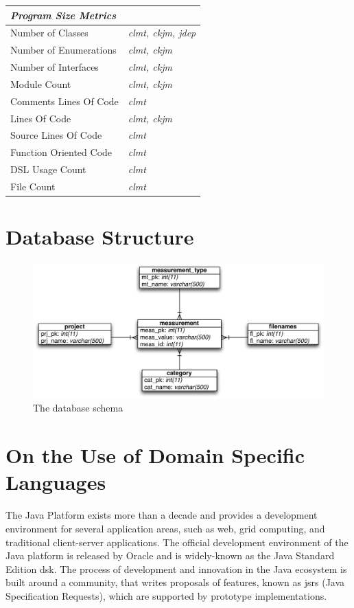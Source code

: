 \documentclass{sig-alternate}
\begin{document}
\begin{table}
\begin{tabular}{l l}
\hline
\multicolumn{2}{l}{\textit{\textbf{Program Size Metrics}}}\\
\hline
Number of Classes & \textit{clmt, ckjm, jdep}\\
Number of Enumerations & \textit{clmt, ckjm}\\
Number of Interfaces & \textit{clmt, ckjm}\\
Module Count & \textit{clmt, ckjm}\\
Comments Lines Of Code & \textit{clmt}\\
Lines Of Code & \textit{clmt, ckjm}\\
Source Lines Of Code & \textit{clmt}\\
Function Oriented Code & \textit{clmt}\\
DSL Usage Count & \textit{clmt}\\
File Count & \textit{clmt}\\
\hline
\end{tabular}
\end{table}

\section{Database Structure}
\label{sec:db}

\begin{figure}
\centering
\includegraphics[scale=0.7]{database-schema}
\caption{The database schema}
\label{fig:database-schema}
\end{figure}

\section{On the Use of Domain Specific Languages}
\label{sec:dsl}

The Java Platform exists more than a decade and provides a development environment for several application areas, such as web, grid computing, and traditional client-server applications. The official development environment of the Java platform is released by Oracle and is widely-known as the Java Standard Edition {\sc dsk}. The process of development and innovation in the Java ecosystem is built around a community, that writes proposals of features, known as {\sc jsr}s (Java Specification Requests), which are supported by prototype implementations.
\end{document}
